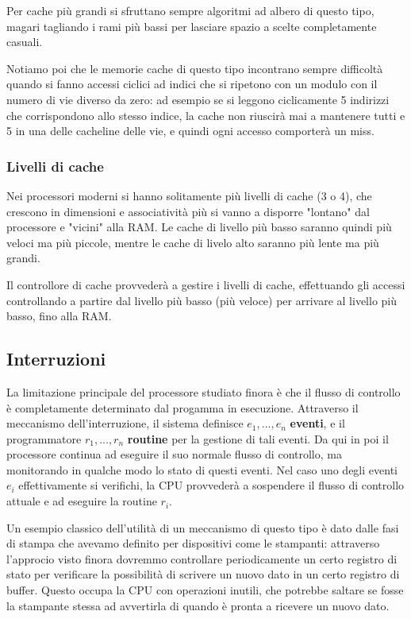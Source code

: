 \documentclass[a4paper,11pt]{article}
\begin{document}
Per cache più grandi si sfruttano sempre algoritmi ad albero di questo tipo, magari tagliando i rami più bassi per lasciare spazio a scelte completamente casuali.

Notiamo poi che le memorie cache di questo tipo incontrano sempre difficoltà quando si fanno accessi ciclici ad indici che si ripetono con un modulo con il numero di vie diverso da zero: ad esempio se si leggono ciclicamente 5 indirizzi che corrispondono allo stesso indice, la cache non riuscirà mai a mantenere tutti e 5 in una delle cacheline delle vie, e quindi ogni accesso comporterà un miss.

\subsubsection{Livelli di cache}
Nei processori moderni si hanno solitamente più livelli di cache (3 o 4), che crescono in dimensioni e associatività più si vanno a disporre "lontano" dal processore e "vicini" alla RAM.
Le cache di livello più basso saranno quindi più veloci ma più piccole, mentre le cache di livelo alto saranno più lente ma più grandi.

Il controllore di cache provvederà a gestire i livelli di cache, effettuando gli accessi controllando a partire dal livello più basso (più veloce) per arrivare al livello più basso, fino alla RAM.

\subsection{Interruzioni}
La limitazione principale del processore studiato finora è che il flusso di controllo è completamente determinato dal progamma in esecuzione.
Attraverso il meccanismo dell'interruzione, il sistema definisce $e_1, ..., e_n$ \textbf{eventi}, e il programmatore $r_1, ..., r_n$ \textbf{routine} per la gestione di tali eventi.
Da qui in poi il processore continua ad eseguire il suo normale flusso di controllo, ma monitorando in qualche modo lo stato di questi eventi.
Nel caso uno degli eventi $e_i$ effettivamente si verifichi, la CPU provvederà a sospendere il flusso di controllo attuale e ad eseguire la routine $r_i$.

Un esempio classico dell'utilità di un meccanismo di questo tipo è dato dalle fasi di stampa che avevamo definito per dispositivi come le stampanti: attraverso l'approcio visto finora dovremmo controllare periodicamente un certo registro di stato per verificare la possibilità di scrivere un nuovo dato in un certo registro di buffer.
Questo occupa la CPU con operazioni inutili, che potrebbe saltare se fosse la stampante stessa ad avvertirla di quando è pronta a ricevere un nuovo dato.
\end{document}
